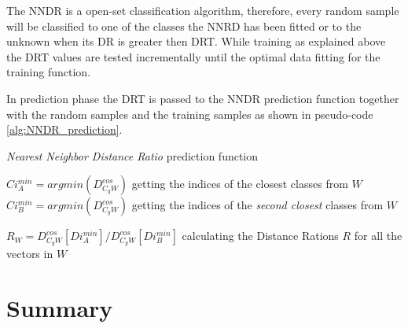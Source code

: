 The NNDR is a open-set classification algorithm, therefore, every random sample will be classified to one of the classes the NNRD has been fitted or to the unknown when its DR is greater then DRT. While training as explained above the DRT values are tested incrementally until the optimal data fitting for the training function.

In prediction phase the DRT is passed to the NNDR prediction function together with the random samples and the training samples as shown in pseudo-code \ref{alg:NNDR_prediction}.

\hfill

\begin{algorithm}[H]
\caption{\textit{Nearest Neighbor Distance Ratio} prediction function}\label{alg:NNDR_prediction}


$Ci^{min}_{A} = argmin(D^{cos}_{C_{g}W})$ getting the indices of the closest classes from $W$\;
$Ci^{min}_{B} = argmin(D^{cos}_{C_{g}W})$ getting the indices of the \textit{second closest} classes from $W$\;

$R_{W} = D^{cos}_{C_{g}W}[Di^{min}_{A}] / D^{cos}_{C_{g}W}[Di^{min}_{B}]$ calculating the Distance Rations $R$ for all the vectors in $W$


\end{algorithm}

\hfill


\section{Summary}\label{chap:openset:sec:NNRD_Description}


